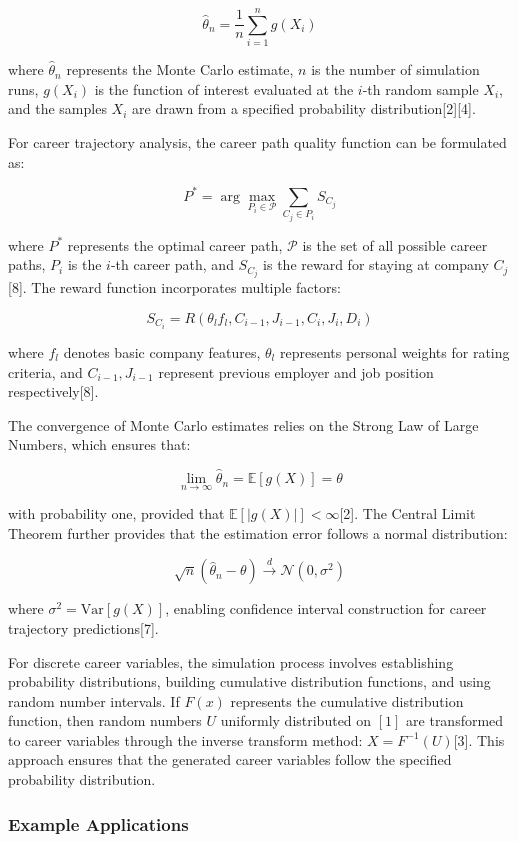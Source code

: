 \documentclass[main.tex]{subfiles}
\begin{document}
$$\hat{\theta}_n = \frac{1}{n}\sum_{i=1}^{n} g(X_i)$$

where $\hat{\theta}_n$ represents the Monte Carlo estimate, $n$ is the number of simulation runs, $g(X_i)$ is the function of interest evaluated at the $i$-th random sample $X_i$, and the samples $X_i$ are drawn from a specified probability distribution[2][4].

For career trajectory analysis, the career path quality function can be formulated as:

$$P^* = \arg\max_{P_i \in \mathcal{P}} \sum_{C_j \in P_i} S_{C_j}$$

where $P^*$ represents the optimal career path, $\mathcal{P}$ is the set of all possible career paths, $P_i$ is the $i$-th career path, and $S_{C_j}$ is the reward for staying at company $C_j$[8]. The reward function incorporates multiple factors:

$$S_{C_i} = R(\theta_l f_l, C_{i-1}, J_{i-1}, C_i, J_i, D_i)$$

where $f_l$ denotes basic company features, $\theta_l$ represents personal weights for rating criteria, and $C_{i-1}, J_{i-1}$ represent previous employer and job position respectively[8].

The convergence of Monte Carlo estimates relies on the Strong Law of Large Numbers, which ensures that:

$$\lim_{n \to \infty} \hat{\theta}_n = \mathbb{E}[g(X)] = \theta$$

with probability one, provided that $\mathbb{E}[|g(X)|] < \infty$[2]. The Central Limit Theorem further provides that the estimation error follows a normal distribution:

$$\sqrt{n}(\hat{\theta}_n - \theta) \xrightarrow{d} \mathcal{N}(0, \sigma^2)$$

where $\sigma^2 = \text{Var}[g(X)]$, enabling confidence interval construction for career trajectory predictions[7].

For discrete career variables, the simulation process involves establishing probability distributions, building cumulative distribution functions, and using random number intervals. If $F(x)$ represents the cumulative distribution function, then random numbers $U$ uniformly distributed on $[1]$ are transformed to career variables through the inverse transform method: $X = F^{-1}(U)$[3]. This approach ensures that the generated career variables follow the specified probability distribution.

\subsubsection{Example Applications}
\end{document}
